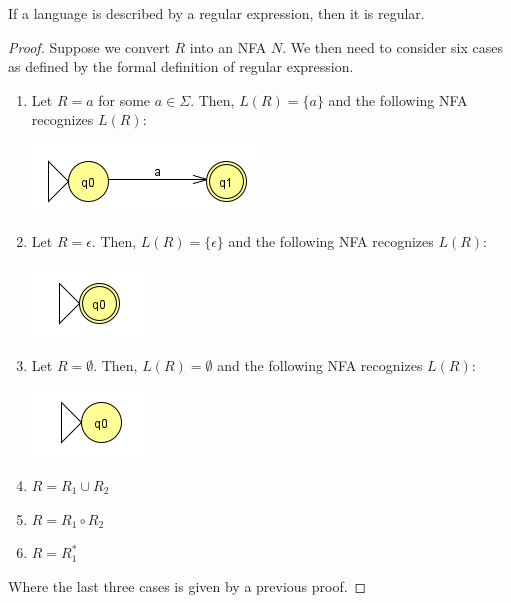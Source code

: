 \documentclass[letterpaper]{article}
\begin{document}
\begin{lemma}{}{}
    If a language is described by a regular expression, then it is regular. 
\end{lemma}

\begin{mdframed}[]
    \begin{proof}
        Suppose we convert $R$ into an NFA $N$. We then need to consider six cases as defined by the formal definition of regular expression.
        \begin{enumerate}
            \item Let $R = a$ for some $a \in \Sigma$. Then, $L(R) = \{a\}$ and the following NFA recognizes $L(R)$:
            \begin{center}
                \includegraphics[scale=0.75]{../assets/nfa_regex_pf_1.png}
            \end{center}
            
            \item Let $R = \epsilon$. Then, $L(R) = \{\epsilon\}$ and the following NFA recognizes $L(R)$:
            \begin{center}
                \includegraphics[scale=0.75]{../assets/nfa_regex_pf_2.png}
            \end{center}

            \item Let $R = \emptyset$. Then, $L(R) = \emptyset$ and the following NFA recognizes $L(R)$:
            \begin{center}
                \includegraphics[scale=0.75]{../assets/nfa_regex_pf_3.png}
            \end{center}

            \item $R = R_1 \cup R_2$
            \item $R = R_1 \circ R_2$
            \item $R = R_{1}^*$
        \end{enumerate}
        Where the last three cases is given by a previous proof. 
    \end{proof}
\end{mdframed}
\end{document}
